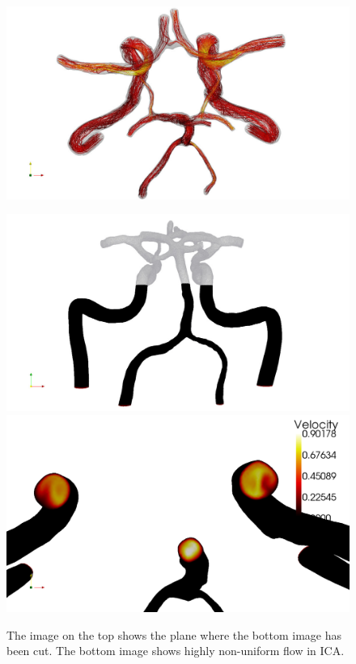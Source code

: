 \begin{figure}
          {\includegraphics[width=\fullfig]{chapters/kvs-2/pdf/cok_top_steam_white.pdf}}
\end{figure}

\begin{figure}
\bwfig
  \centering
  \includegraphics[width=\largefig]{chapters/kvs-2/pdf/cok_slice.pdf} \\
  \includegraphics[width=\largefig]{chapters/kvs-2/pdf/cok_ica_vel_peak_syst.pdf}
  \caption{The image on the top shows the plane where the bottom
    image has been cut. The bottom image shows highly
    non-uniform flow in ICA.}
  \label{fig:kvs-2:cok_ica}
\end{figure}
